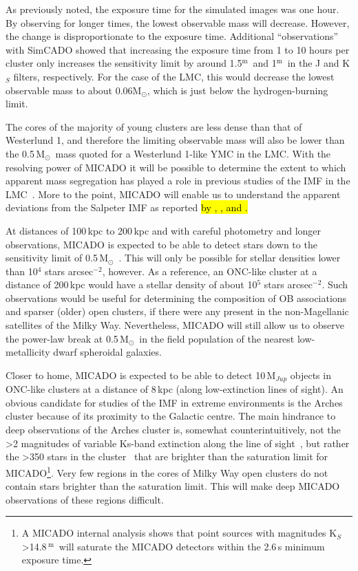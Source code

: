 \documentclass{aa}
\newcommand{\m}{$^\mathrm{m}$~}
\newcommand{\msun}{M$_\odot$~}
\newcommand{\msune}{M$_\odot$}
\newcommand{\h}[1]{$^{#1}$}
\newcommand{\spae}{stars arcsec$^{-2}$}
\begin{document}
As previously noted, the exposure time for the simulated images was one hour.
By observing for longer times, the lowest observable mass will decrease.
However, the change is disproportionate to the exposure time.
Additional ``observations'' with SimCADO showed that increasing the exposure time from 1 to 10 hours per cluster only increases the sensitivity limit by around 1.5\m and 1\m in the J and K$_S$ filters, respectively.
For the case of the LMC, this would decrease the lowest observable mass to about 0.06\msune, which is just below the hydrogen-burning limit.

The cores of the majority of young clusters are less dense than that of Westerlund 1, and therefore the limiting observable mass will also be lower than the 0.5\,\msun mass quoted for a Westerlund 1-like YMC in the LMC\@.
With the resolving power of MICADO it will be possible to determine the extent to which apparent mass segregation has played a role in previous studies of the IMF in the LMC~\citep{Ascenso2009-de}.
More to the point, MICADO will enable us to understand the apparent deviations from the Salpeter IMF as reported \hl{by \citet{dario2009}, \citet{geha2013}, and \citet{kalirai2013}.}

At distances of 100\,kpc to 200\,kpc and with careful photometry and longer observations, MICADO is expected to be able to detect stars down to the sensitivity limit of 0.5\,\msun.
This will only be possible for stellar densities lower than 10\h4 \spae, however.
As a reference, an ONC-like cluster at a distance of 200\,kpc would have a stellar density of about 10\h5 \spae.
Such observations would be useful for determining the composition of OB associations and sparser (older) open clusters, if there were any present in the non-Magellanic satellites of the Milky Way.
Nevertheless, MICADO will still allow us to observe the power-law break at 0.5\,\msun in the field population of the nearest low-metallicity dwarf spheroidal galaxies.

Closer to home, MICADO is expected to be able to detect 10\,M$_{Jup}$ objects in ONC-like clusters at a distance of 8\,kpc (along low-extinction lines of sight).
An obvious candidate for studies of the IMF in extreme environments is the Arches cluster because of its proximity to the Galactic centre.
The main hindrance to deep observations of the Arches cluster is, somewhat counterintuitively, not the \textgreater2 magnitudes of variable Ks-band extinction along the line of sight~\citep{espinoza2009}, but rather the \textgreater350 stars in the cluster~\citep{galacticnucleaus} that are brighter than the saturation limit for MICADO\footnote{A MICADO internal analysis shows that point sources with magnitudes K$_S$\textgreater14.8\,\m will saturate the MICADO detectors within the 2.6\,s minimum exposure time.}.
Very few regions in the cores of Milky Way open clusters do not contain stars brighter than the saturation limit.
This will make deep MICADO observations of these regions difficult.
\end{document}
